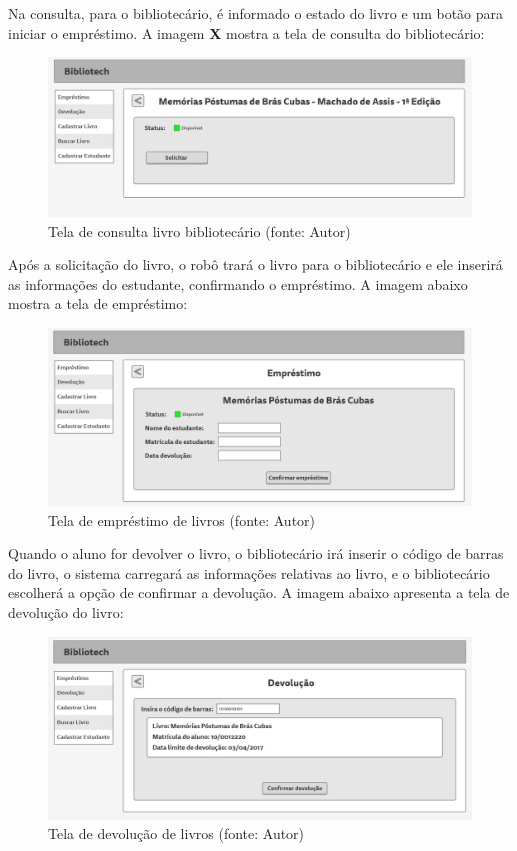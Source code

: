 Na consulta, para o bibliotecário, é informado o estado do livro e um botão para iniciar o empréstimo. A imagem \textbf{X} mostra a tela de consulta do bibliotecário:

\begin{figure}[!h]
\centering
\includegraphics[scale=0.40, angle = 360]{figuras/prototipo9}
\caption[]{Tela de consulta livro bibliotecário (fonte: Autor)}
\end{figure}
\FloatBarrier

Após a solicitação do livro, o robô trará o livro para o bibliotecário e ele inserirá as informações do estudante, confirmando o empréstimo. A imagem abaixo mostra a tela de empréstimo:

\begin{figure}[!h]
\centering
\includegraphics[scale=0.40, angle = 360]{figuras/prototipo10}
\caption[]{Tela de empréstimo de livros (fonte: Autor)}
\end{figure}
\FloatBarrier

Quando o aluno for devolver o livro, o bibliotecário irá inserir o código de barras do livro, o sistema carregará as informações relativas ao livro, e o bibliotecário escolherá a opção de confirmar a devolução. A imagem abaixo apresenta a tela de devolução do livro:

\begin{figure}[!h]
\centering
\includegraphics[scale=0.40, angle = 360]{figuras/prototipo11}
\caption[]{Tela de devolução de livros (fonte: Autor)}
\end{figure}
\FloatBarrier